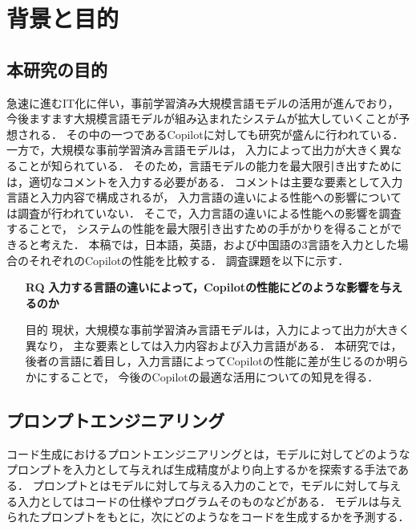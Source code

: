 \section{背景と目的\label{related_research}}

\subsection{本研究の目的}
  急速に進むIT化に伴い，事前学習済み大規模言語モデルの活用が進んでおり，
  今後ますます大規模言語モデルが組み込まれたシステムが拡大していくことが予想される．
  その中の一つであるCopilotに対しても研究が盛んに行われている\cite{Yao2022ACL}\cite{Nguyen2022MSR}\cite{Sobania2022GECCO}\cite{Dakhel2022arXiv}\cite{Vaithilingam2022CHI}．
  一方で，大規模な事前学習済み言語モデルは，
  入力によって出力が大きく異なることが知られている\cite{Yao2022ACL}．
  そのため，言語モデルの能力を最大限引き出すためには，適切なコメントを入力する必要がある．
  コメントは主要な要素として入力言語と入力内容で構成されるが，
  入力言語の違いによる性能への影響については調査が行われていない．
  そこで，入力言語の違いによる性能への影響を調査することで，
  システムの性能を最大限引き出すための手がかりを得ることができると考えた．
  本稿では，日本語，英語，および中国語の3言語を入力とした場合のそれぞれのCopilotの性能を比較する．
  調査課題を以下に示す．

  
  \begin{itemize}
    \item[\textbf{RQ}] \textbf{入力する言語の違いによって，Copilotの性能にどのような影響を与えるのか}
      \item[目的]{%
      現状，大規模な事前学習済み言語モデルは，入力によって出力が大きく異なり，
      主な要素としては入力内容および入力言語がある．
      本研究では，後者の言語に着目し，入力言語によってCopilotの性能に差が生じるのか明らかにすることで，
      今後のCopilotの最適な活用についての知見を得る．}
  \end{itemize}

\subsection{プロンプトエンジニアリング}
  コード生成におけるプロントエンジニアリングとは，モデルに対してどのようなプロンプトを入力として与えれば生成精度がより向上するかを探索する手法である．
  プロンプトとはモデルに対して与える入力のことで，モデルに対して与える入力としてはコードの仕様やプログラムそのものなどがある．
  モデルは与えられたプロンプトをもとに，次にどのようなをコードを生成するかを予測する．

